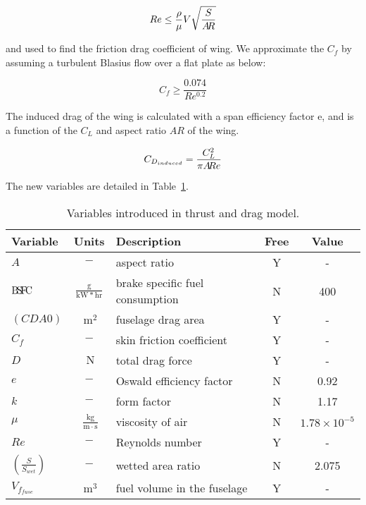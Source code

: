 \begin{equation}
    Re \leq \frac{\rho}{\mu} V \sqrt{\frac{S}{A\hspace{-2.0pt}R}}
\label{e:re}
\end{equation}

and used to find the friction drag coefficient of wing. We approximate the $C_f$ by assuming a
turbulent Blasius flow over a flat plate as below:

\begin{equation}
    C_f \geq \frac{0.074} {Re^{0.2}}
\end{equation}

The induced drag of the wing is calculated with a span efficiency factor e, and is a
function of the $C_L$ and aspect ratio $AR$ of the wing.

\begin{equation}
    C_{D_{induced}} = \frac{C_L^2}{\pi A\hspace{-2.0pt}R e}
\label{e:cdinduced}
\end{equation}

The new variables are detailed in Table~\ref{t:vars_TandD}.

\begin{footnotesize}
\begin{table}
    \centering
    \begin{tabular}{ l c l c c }
        \toprule
        Variable & Units & Description & Free & Value \\
        \midrule
        $A$ & $-$ & aspect ratio & Y & - \\
        ${\rm B\!S\!F\!C}$ & $\mathrm{\frac{g}{kW*hr}}$ & brake specific fuel consumption & N & 400 \\
        $(CDA0)$ & $~\mathrm{m^{2}}$ & fuselage drag area & Y & - \\
        $C_f$ & $-$ & skin friction coefficient & Y & - \\
        $D$ & $~\mathrm{N}$ & total drag force & Y & - \\
        $e$ & $-$ & Oswald efficiency factor & N & 0.92 \\
        $k$ & $-$ & form factor & N & 1.17 \\
        $\mu$ & $~\mathrm{\tfrac{kg}{m\cdot s}}$ & viscosity of air & N &
            $\mathrm{1.78 \times 10^{-5}}$ \\
        $Re$ & $-$ & Reynolds number & Y & - \\
        $\left(\frac{S}{S_{wet}}\right)$ & $-$ & wetted area ratio & N & 2.075 \\
        $V_{f_{fuse}}$ & $~\mathrm{m^{3}}$ & fuel volume in the fuselage & Y & - \\
        \bottomrule
    \end{tabular}
    \caption{Variables introduced in thrust and drag model.}
    \label{t:vars_TandD}
\end{table} \end{footnotesize}

